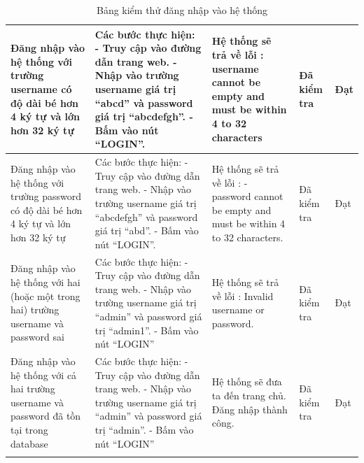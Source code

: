 \documentclass{article}
\begin{document}
\begin{longtable}{ | p{} |p{} | p{}  | p{}  | p{}  | }
\hline
Đăng nhập vào hệ thống với trường username có độ dài bé hơn 4 ký tự và lớn hơn 32 ký tự &
Các bước thực hiện: \newline
- Truy cập vào đường dẫn trang web.  \newline
- Nhập vào trường username giá trị “abcd” và password giá trị “abcdefgh”.  \newline
- Bấm vào nút “LOGIN”.
&
Hệ thống sẽ trả về lỗi : \newline
username cannot be empty and must be within 4 to 32 characters \newline
&
Đã kiểm tra &
Đạt \\


\hline
Đăng nhập vào hệ thống với trường password có độ dài bé hơn 4 ký tự và lớn hơn 32 ký tự &
Các bước thực hiện: \newline
- Truy cập vào đường dẫn trang web. \newline
- Nhập vào trường username giá trị “abcdefgh” và password giá trị “abd”. \newline
- Bấm vào nút “LOGIN”.
 &
Hệ thống sẽ trả về lỗi : \newline
- password cannot be empty and must be within 4 to 32 characters.
 &
Đã kiểm tra &
Đạt \\

\hline
Đăng nhập vào hệ thống với hai (hoặc một trong hai) trường username và password sai  &
Các bước thực hiện: \newline
- Truy cập vào đường dẫn trang web. \newline
- Nhập vào trường username giá trị “admin” và password giá trị “admin1”.  \newline
- Bấm vào nút “LOGIN”
&
Hệ thống sẽ trả về lỗi : Invalid username or password.
&
Đã kiểm tra &
Đạt \\

\hline
Đăng nhập vào hệ thống với cả hai trường username và password đã tồn tại trong database &
Các bước thực hiện: \newline
- Truy cập vào đường dẫn trang web. \newline
- Nhập vào trường username giá trị “admin” và password giá trị “admin”.  \newline
- Bấm vào nút “LOGIN”
&
Hệ thống sẽ đưa ta đến trang chủ. Đăng nhập thành công. &
Đã kiểm tra &
Đạt \\
\hline
\caption{Bảng kiểm thử đăng nhập vào hệ thống}
\end{longtable}
\end{document}
